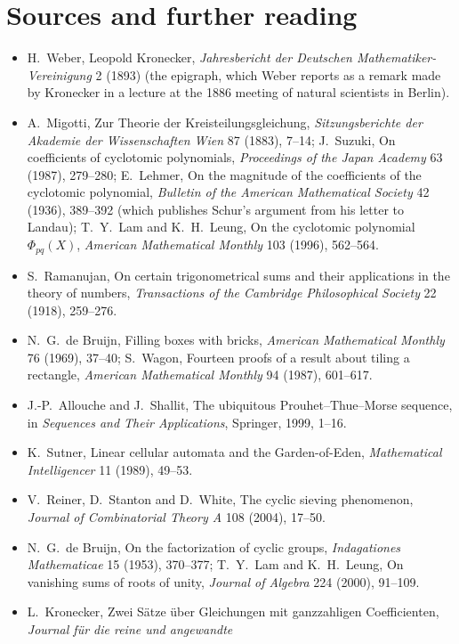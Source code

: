 \section*{Sources and further reading}

\begin{itemize}
\item H.~Weber, Leopold Kronecker, \emph{Jahresbericht der Deutschen Mathematiker-Vereinigung} 2 (1893) (the epigraph,
which Weber reports as a remark made by Kronecker in a lecture at the 1886 meeting of natural scientists in Berlin).
\item A.~Migotti, Zur Theorie der Kreisteilungsgleichung, \emph{Sitzungsberichte der Akademie der Wissenschaften Wien} 87
(1883), 7--14; J.~Suzuki, On coefficients of cyclotomic polynomials, \emph{Proceedings of the Japan Academy} 63 (1987),
279--280; E.~Lehmer, On the magnitude of the coefficients of the cyclotomic polynomial, \emph{Bulletin of the American
Mathematical Society} 42 (1936), 389--392 (which publishes Schur's argument from his letter to Landau); T.~Y.~Lam and K.~H.~Leung, On the cyclotomic polynomial $\Phi_{pq}(X)$, \emph{American Mathematical Monthly} 103
(1996), 562--564.
\item S.~Ramanujan, On certain trigonometrical sums and their applications in the theory of numbers, \emph{Transactions of the
Cambridge Philosophical Society} 22 (1918), 259--276.
\item N.~G.~de Bruijn, Filling boxes with bricks, \emph{American Mathematical Monthly} 76 (1969), 37--40; S.~Wagon, Fourteen
proofs of a result about tiling a rectangle, \emph{American Mathematical Monthly} 94 (1987), 601--617.
\item J.-P.~Allouche and J.~Shallit, The ubiquitous Prouhet--Thue--Morse sequence, in \emph{Sequences and Their Applications},
Springer, 1999, 1--16.
\item K.~Sutner, Linear cellular automata and the Garden-of-Eden, \emph{Mathematical Intelligencer} 11 (1989), 49--53.
\item V.~Reiner, D.~Stanton and D.~White, The cyclic sieving phenomenon, \emph{Journal of Combinatorial Theory A} 108 (2004),
17--50.
\item N.~G.~de Bruijn, On the factorization of cyclic groups, \emph{Indagationes Mathematicae} 15 (1953), 370--377; T.~Y.~Lam and
K.~H.~Leung, On vanishing sums of roots of unity, \emph{Journal of Algebra} 224 (2000), 91--109.
\item L.~Kronecker, Zwei Sätze über Gleichungen mit ganzzahligen Coefficienten, \emph{Journal für die reine und angewandte
}
\end{itemize}
